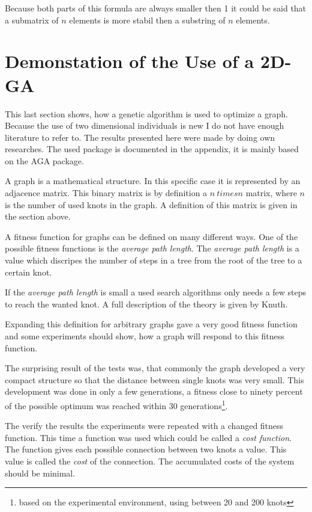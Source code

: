 Because both parts of this formula are always smaller then 1 it could be said
that a submatrix of $n$ elements is more stabil then a substring of $n$ elements.

\section{Demonstation of the Use of a 2D-GA}
This last section shows, how a genetic algorithm is used to optimize a graph\cite{Gri91a}.
Because the use of two dimensional individuals is new I do not have enough
literature to refer to. The results presented here were made by doing own researches.
The used package is documented in the appendix, it is mainly based on the AGA
package.

A graph is a mathematical structure. In this specific case it is represented
by an adjacence matrix. This binary matrix is by definition a $n \ times n$
matrix, where $n$ is the number of used knots in the graph. A definition of this
matrix is given in the section above.

A fitness function for graphs can be defined on many different ways. One of the
possible fitness functions is the {\it average path length}. The {\it average
path length} is a value which discripes the number of steps in a tree from the
root of the tree to a certain knot.

If the {\it average path length} is small a used search algorithms only needs
a few steps to reach the wanted knot. A full description of the theory is given
by {\sc Knuth}\cite{Knu68}.

Expanding this definition for arbitrary graphs gave a very good fitness function
and some experiments should show, how a graph will respond to this fitness function.

The surprising result of the tests was, that commonly the graph developed a very
compact structure so that the distance between single knots was very small.
This development was done in only a few generations, a fitness close to ninety
percent of the possible optimum was reached within 30 generations\footnote{based
on the experimental environment, using between 20 and 200 knots}.

The verify the results the experiments were repeated with a changed fitness
function. This time a function was used which could be called a {\it cost function}.
The function gives each possible connection between two knots a value. This value is
called the {\it cost} of the connection. The accumulated costs of the system
should be minimal.

